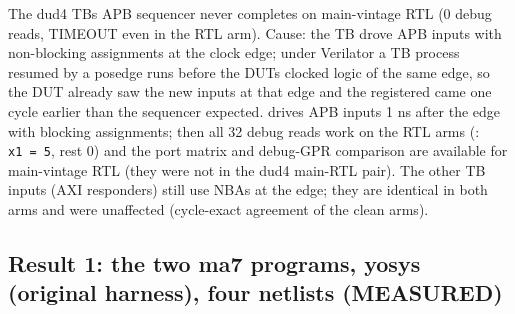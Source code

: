 \begin{record}

The dud4 TB\textquotesingle s APB sequencer never completes on
main-vintage RTL (0 debug reads, TIMEOUT even in the RTL arm). Cause:
the TB drove APB inputs with non-blocking assignments at the clock edge;
under Verilator  a TB process resumed by a posedge runs
before the DUT\textquotesingle s clocked logic of the same edge, so the
DUT already saw the new inputs at that edge and the registered
 came one cycle earlier than the sequencer expected.
 drives APB inputs 1 ns after the edge with
blocking assignments; then all 32 debug reads work on the RTL arms
(: \texttt{x1\ =\allowbreak{}\ 5}, rest 0) and the port
matrix and debug-GPR comparison are available for main-vintage RTL (they
were not in the dud4 main-RTL pair). The other TB inputs (AXI
responders) still use NBAs at the edge; they are identical in both arms
and were unaffected (cycle-exact agreement of the clean arms).

\end{record}

\subsection{\texorpdfstring{Result 1: the two ma7 programs, yosys
 (original harness), four netlists
(MEASURED)}{Result 1: the two ma7 programs, yosys  (original harness), four netlists (MEASURED)}}\label{cr:defect:asap7-cpu-synlig-ma7:result-1-the-two-ma7-programs-yosys-sim-original-harness-four-netlists-measured}

